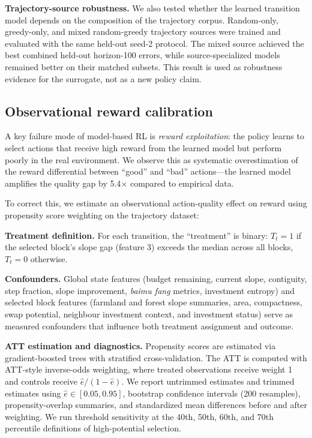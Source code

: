 \documentclass[11pt]{article}
\begin{document}
\textbf{Trajectory-source robustness.} We also tested whether the learned transition model depends on the composition of the trajectory corpus. Random-only, greedy-only, and mixed random-greedy trajectory sources were trained and evaluated with the same held-out seed-2 protocol. The mixed source achieved the best combined held-out horizon-100 errors, while source-specialized models remained better on their matched subsets. This result is used as robustness evidence for the surrogate, not as a new policy claim.

\subsection{Observational reward calibration}
\label{sec:calibration}

A key failure mode of model-based RL is \textit{reward exploitation}: the policy learns to select actions that receive high reward from the learned model but perform poorly in the real environment. We observe this as systematic overestimation of the reward differential between ``good'' and ``bad'' actions---the learned model amplifies the quality gap by 5.4$\times$ compared to empirical data.

To correct this, we estimate an observational action-quality effect on reward using propensity score weighting on the trajectory dataset:

\textbf{Treatment definition.} For each transition, the ``treatment'' is binary: $T_t = 1$ if the selected block's slope gap (feature 3) exceeds the median across all blocks, $T_t = 0$ otherwise.

\textbf{Confounders.} Global state features (budget remaining, current slope, contiguity, step fraction, slope improvement, \textit{baimu fang} metrics, investment entropy) and selected block features (farmland and forest slope summaries, area, compactness, swap potential, neighbour investment context, and investment status) serve as measured confounders that influence both treatment assignment and outcome.

\textbf{ATT estimation and diagnostics.} Propensity scores are estimated via gradient-boosted trees with stratified cross-validation. The ATT is computed with ATT-style inverse-odds weighting, where treated observations receive weight 1 and controls receive $\hat{e}/(1-\hat{e})$. We report untrimmed estimates and trimmed estimates using $\hat{e} \in [0.05,0.95]$, bootstrap confidence intervals (200 resamples), propensity-overlap summaries, and standardized mean differences before and after weighting. We run threshold sensitivity at the 40th, 50th, 60th, and 70th percentile definitions of high-potential selection.
\end{document}
